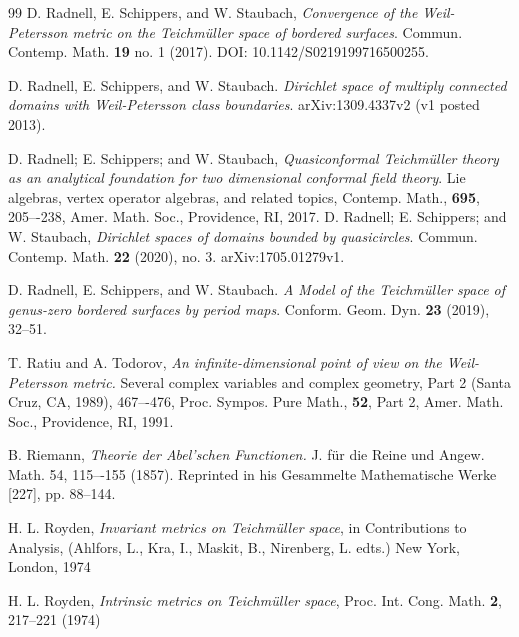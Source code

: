 \documentclass[12pt]{amsart}
\theoremstyle{plain}
\theoremstyle{definition}
\theoremstyle{remark}
\numberwithin{equation}{section} %
\numberwithin{figure}{section} %
\begin{document}
\begin{thebibliography}{99}
 D. Radnell, E. Schippers, and W. Staubach, {\it Convergence of the Weil-Petersson metric on the Teichm\"uller space of bordered surfaces}.   Commun. Contemp. Math. {\bf 19} no. 1 (2017). DOI: 10.1142/S0219199716500255. %

    D. Radnell, E. Schippers, and W. Staubach. {\it Dirichlet space of multiply connected domains with Weil-Petersson class boundaries}.  arXiv:1309.4337v2 (v1 posted 2013).

 D. Radnell; E. Schippers; and W. Staubach,
\textit{Quasiconformal Teichm\"uller theory as an analytical foundation for two dimensional conformal field theory}. Lie algebras, vertex operator algebras, and related topics,  Contemp. Math., {\bf 695}, 205–-238, Amer. Math. Soc., Providence, RI, 2017. 
  D. Radnell; E. Schippers; and W. Staubach, {\it Dirichlet spaces of domains bounded by quasicircles}.  Commun. Contemp. Math. {\bf 22} (2020), no. 3.  arXiv:1705.01279v1.  

 D. Radnell, E. Schippers, and W. Staubach. {\it A Model of the Teichmüller space of genus-zero bordered surfaces by period maps}. 
    Conform. Geom. Dyn. {\bf 23} (2019), 32--51. 


 T. Ratiu and A. Todorov, {\it 
An infinite-dimensional point of view on the Weil-Petersson metric.} Several complex variables and complex geometry, Part 2 (Santa Cruz, CA, 1989), 467–-476, 
Proc. Sympos. Pure Math., {\bf 52}, Part 2, Amer. Math. Soc., Providence, RI, 1991. 


 B. Riemann, {\it Theorie der Abel’schen Functionen.} J. für die Reine und Angew. Math. 54, 115–-155 (1857). Reprinted in his Gesammelte Mathematische Werke [227], pp. 88–144.



 H. L. Royden, {\it Invariant metrics on Teichm\"uller space}, in Contributions to Analysis, (Ahlfors, L., Kra, I., Maskit, B., Nirenberg, L. edts.) New York, London, 1974

 H. L. Royden,  {\it Intrinsic metrics on Teichm\"uller space}, Proc. Int. Cong. Math. {\bf 2}, 217--221 (1974)


\end{thebibliography}
\end{document}
